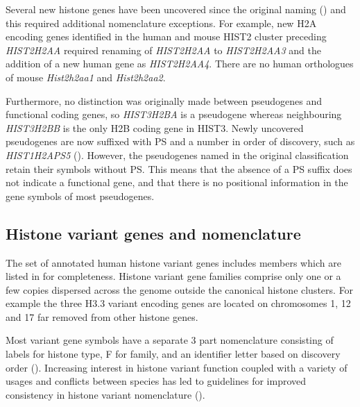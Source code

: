     Several new histone genes have been uncovered since the original naming ()
    and this required additional nomenclature exceptions.
    For example, new H2A encoding genes identified in the human and mouse HIST2 cluster preceding \textit{HIST2H2AA}
    required renaming of \textit{HIST2H2AA} to \textit{HIST2H2AA3}
    and the addition of a new human gene as \textit{HIST2H2AA4}.
    There are no human orthologues of mouse \textit{Hist2h2aa1} and \textit{Hist2h2aa2}.

    Furthermore, no distinction was originally made between pseudogenes and functional coding genes,
    so \textit{HIST3H2BA} is a pseudogene whereas neighbouring \textit{HIST3H2BB} is the only H2B coding gene in HIST3.
    Newly uncovered pseudogenes are now suffixed with PS and a number in order of discovery,
    such as \textit{HIST1H2APS5} ().
    However, the pseudogenes named in the original classification retain their symbols without PS.
    This means that the absence of a PS suffix does not indicate a functional gene,
    and that there is no positional information in the gene symbols of most pseudogenes.

  \subsection{Histone variant genes and nomenclature}
    The set of annotated human histone variant genes
    includes  members
    which are listed in  for completeness.
    Histone variant gene families comprise only one or a few copies
    dispersed across the genome outside the canonical histone clusters.
    For example the three H3.3 variant encoding genes are located
    on chromosomes 1, 12 and 17 far removed from other histone genes.

    Most variant gene symbols have a separate 3 part nomenclature
    consisting of labels for histone type, F for family,
    and an identifier letter based on discovery order ().
    Increasing interest in histone variant function \citep{MazeAllis2014}
    coupled with a variety of usages and conflicts between species
    has led to guidelines for improved consistency in histone variant nomenclature
    \citep{Talbert2012} ().
